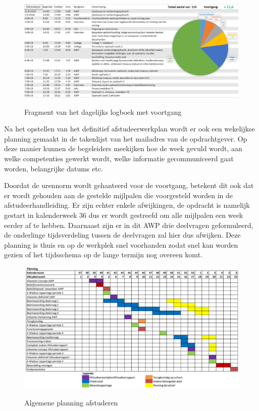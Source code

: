 \documentclass[10pt,a4paper,oneside]{report}
\begin{document}
\begin{figure}[h]
    \centering
    \includegraphics[width=\textwidth]{logboek}
    \label{fig:logboek}
    \caption{Fragment van het dagelijks logboek met voortgang}
\end{figure}

Na het opstellen van het definitief afstudeerwerkplan wordt er ook een wekelijkse planning gemaakt in de takenlijst van het mailadres van de opdrachtgever. Op deze manier kunnen de begeleiders meekijken hoe de week gevuld wordt, aan welke competenties gewerkt wordt, welke informatie gecommuniceerd gaat worden, belangrijke datums etc.

\newpage
Doordat de urennorm wordt gehanteerd voor de voortgang, betekent dit ook dat er wordt gehouden aan de gestelde mijlpalen die voorgesteld worden in de afstudeerhandleiding. Er zijn echter enkele afwijkingen, de opdracht is namelijk gestart in kalenderweek 36 dus er wordt gestreefd om alle mijlpalen een week eerder af te hebben. Daarnaast zijn er in dit AWP drie deelvragen geformuleerd, de onderlinge tijdsverdeling tussen de deelvragen zal hier dus afwijken. Deze planning is thuis en op de werkplek snel voorhanden zodat snel kan worden gezien of het tijdsschema op de lange termijn nog overeen komt.

\begin{figure}[!ht]
    \centering
    \includegraphics[angle=0,width=\textwidth]{planning}
    \label{fig:planning}
    \caption{Algemene planning afstuderen}
\end{figure}
\end{document}

